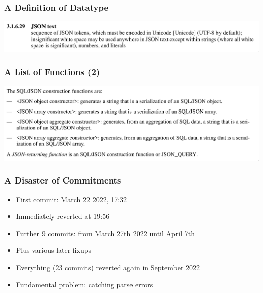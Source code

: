 \begin{frame}
  \frametitle{A Definition of Datatype}
  \centering \includegraphics[width=\textwidth, frame]{jsontext.png}
\end{frame}

\begin{frame}
  \frametitle{A List of Functions (2)}
  \centering \includegraphics[width=\textwidth, frame]{sqljson_functions_2.png}
\end{frame}

\begin{frame}
  \frametitle{A Disaster of Commitments}

  \begin{itemize}
    \item First commit: March 22 2022, 17:32
    \item Immediately reverted at 19:56
      \pause
    \item Further 9 commits: from March 27th 2022 until April 7th
    \item Plus various later fixups
      \pause
    \item Everything (23 commits) reverted again in September 2022
      \pause
    \item Fundamental problem: catching parse errors
  \end{itemize}
\end{frame}

